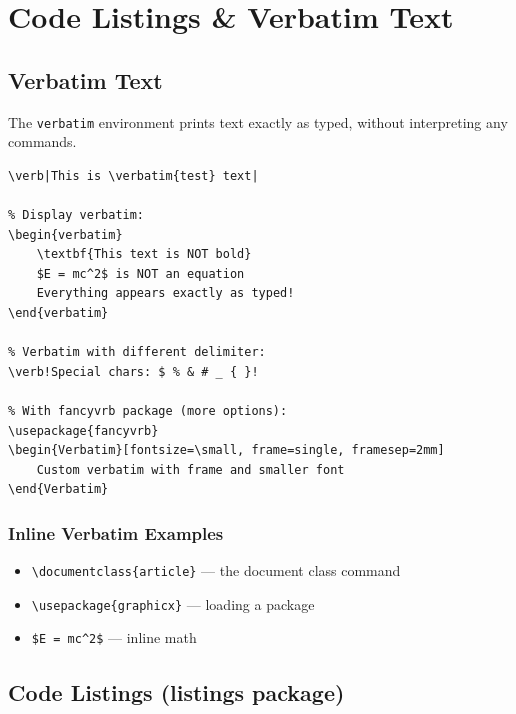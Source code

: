 
\chapter{Code Listings \& Verbatim Text}

\section{Verbatim Text}

The \texttt{verbatim} environment prints text exactly as typed, without interpreting any \latex{} commands.

\begin{lstlisting}[language={[LaTeX]TeX}, caption=Verbatim environments]
% Inline verbatim:
\verb|This is \verbatim{test} text|

% Display verbatim:
\begin{verbatim}
    \textbf{This text is NOT bold}
    $E = mc^2$ is NOT an equation
    Everything appears exactly as typed!
\end{verbatim}

% Verbatim with different delimiter:
\verb!Special chars: $ % & # _ { }!

% With fancyvrb package (more options):
\usepackage{fancyvrb}
\begin{Verbatim}[fontsize=\small, frame=single, framesep=2mm]
    Custom verbatim with frame and smaller font
\end{Verbatim}
\end{lstlisting}

\subsection{Inline Verbatim Examples}

\begin{itemize}
    \item \verb|\documentclass{article}| — the document class command
    \item \verb|\usepackage{graphicx}| — loading a package
    \item \verb|$E = mc^2$| — inline math
\end{itemize}

\section{Code Listings (listings package)}

